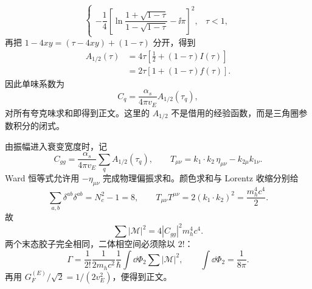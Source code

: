 \begin{derivation}
\begin{equation*}
\begin{cases}
-\dfrac14\left[
\ln\dfrac{1+\sqrt{1-\tau}}{1-\sqrt{1-\tau}}-\ii\pi
\right]^2,&\tau<1,
\end{cases}
\end{equation*}
再把 $1-4xy=(\tau-4xy)+(1-\tau)$ 分开，得到
\begin{align*}
A_{1/2}(\tau)
&=4\tau\left[\frac12+(1-\tau)I(\tau)\right]\\
&=2\tau\left[1+(1-\tau)f(\tau)\right].
\end{align*}
因此单味系数为
\begin{equation*}
C_q=\frac{\alpha_s}{4\pi v_E}A_{1/2}(\tau_q),
\end{equation*}
对所有夸克味求和即得到正文。这里的 $A_{1/2}$ 不是借用的经验函数，而是三角圈参数积分的闭式。

由振幅进入衰变宽度时，记
\begin{equation*}
C_{gg}=\frac{\alpha_s}{4\pi v_E}\sum_qA_{1/2}(\tau_q),
\qquad
T_{\mu\nu}=k_1\!\cdot k_2\,\eta_{\mu\nu}-k_{2\mu}k_{1\nu}.
\end{equation*}
Ward 恒等式允许用 $-\eta_{\mu\nu}$ 完成物理偏振求和。颜色求和与 Lorentz 收缩分别给
\begin{equation*}
\sum_{a,b}\delta^{ab}\delta^{ab}=N_c^2-1=8,
\qquad
T_{\mu\nu}T^{\mu\nu}=2(k_1\!\cdot k_2)^2
=\frac{m_h^4c^4}{2}.
\end{equation*}
故
\begin{equation*}
\sum|\mathcal M|^2=4|C_{gg}|^2m_h^4c^4.
\end{equation*}
两个末态胶子完全相同，二体相空间必须除以 $2!$：
\begin{equation*}
\Gamma
=\frac1{2!}\frac1{2m_hc^2}\frac1\hbar
\int\dd\Phi_2\sum|\mathcal M|^2,
\qquad
\int\dd\Phi_2=\frac1{8\pi}.
\end{equation*}
再用 $G_F^{(E)}/\sqrt2=1/(2v_E^2)$，便得到正文。


\end{derivation}
